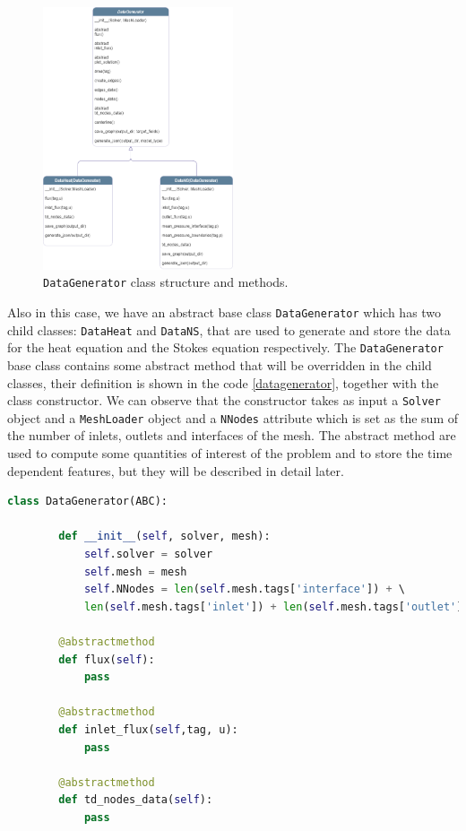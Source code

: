 \documentclass[11pt,a4paper]{article}
\begin{document}
\begin{figure}[H]
    \centering
    \includegraphics[width=0.5\textwidth]{Images/datagenerator_class.png}
    \caption{\texttt{DataGenerator} class structure and methods.}
    \label{datagenerator_class}
\end{figure}

Also in this case, we have an abstract base class \texttt{DataGenerator} which has two child classes: \texttt{DataHeat} and \texttt{DataNS}, that are used to generate and store the data for the heat equation and the Stokes equation respectively.
The \texttt{DataGenerator} base class contains some abstract method that will be overridden in the child classes, their definition is shown in the code \ref{datagenerator}, together with the class constructor. We can observe that the constructor takes as input a \texttt{Solver} object and a \texttt{MeshLoader} object and a \texttt{NNodes} attribute which is set as the sum of the number of inlets, outlets and interfaces of the mesh. The abstract method are used to compute some quantities of interest of the problem and to store the time dependent features, but they will be described in detail later.

\begin{lstlisting}[language=Python, caption={Data generator abstract class.}, label={datagenerator}]
    class DataGenerator(ABC):

        def __init__(self, solver, mesh):
            self.solver = solver
            self.mesh = mesh
            self.NNodes = len(self.mesh.tags['interface']) + \ 
            len(self.mesh.tags['inlet']) + len(self.mesh.tags['outlet'])

        @abstractmethod
        def flux(self):
            pass

        @abstractmethod
        def inlet_flux(self,tag, u):
            pass

        @abstractmethod
        def td_nodes_data(self):
            pass
        
\end{lstlisting}
\end{document}
